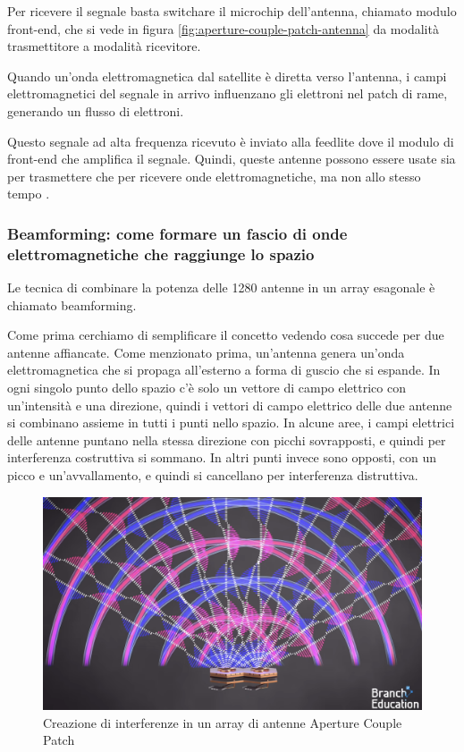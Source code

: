 Per ricevere il segnale basta switchare il microchip dell'antenna, chiamato modulo front-end, che si vede in figura \ref{fig:aperture-couple-patch-antenna} da modalità trasmettitore a modalità ricevitore.

Quando un'onda elettromagnetica dal satellite è diretta verso l'antenna, i campi elettromagnetici del segnale in arrivo influenzano gli elettroni nel patch di rame, generando un flusso di elettroni.

Questo segnale ad alta frequenza ricevuto è inviato alla feedlite dove il modulo di front-end che amplifica il segnale.
Quindi, queste antenne possono essere usate sia per trasmettere che per ricevere onde elettromagnetiche, ma non allo stesso tempo \cite{branch_education_how_2022}.

\subsubsection{Beamforming: come formare un fascio di onde elettromagnetiche che raggiunge lo spazio}
Le tecnica di combinare la potenza delle 1280 antenne in un array esagonale è chiamato beamforming.

Come prima cerchiamo di semplificare il concetto vedendo cosa succede per due antenne affiancate.
Come menzionato prima, un'antenna genera un'onda elettromagnetica che si propaga all'esterno a forma di guscio che si espande.
In ogni singolo punto dello spazio c'è solo un vettore di campo elettrico con un'intensità e una direzione, quindi i vettori di campo elettrico delle due antenne si combinano assieme in tutti i punti nello spazio.
In alcune aree, i campi elettrici delle antenne puntano nella stessa direzione con picchi sovrapposti, e quindi per interferenza costruttiva si sommano.
In altri punti invece sono opposti, con un picco e un'avvallamento, e quindi si cancellano per interferenza distruttiva.

\begin{figure}[htbp]
  \centering
  \includegraphics[width=0.8\linewidth]{./res/img/antenna_interference.png}
  \caption{Creazione di interferenze in un array di antenne Aperture Couple Patch \cite{branch_education_how_2022}}
  \label{fig:aperture-couple-patch-antenna-interference}
\end{figure}

